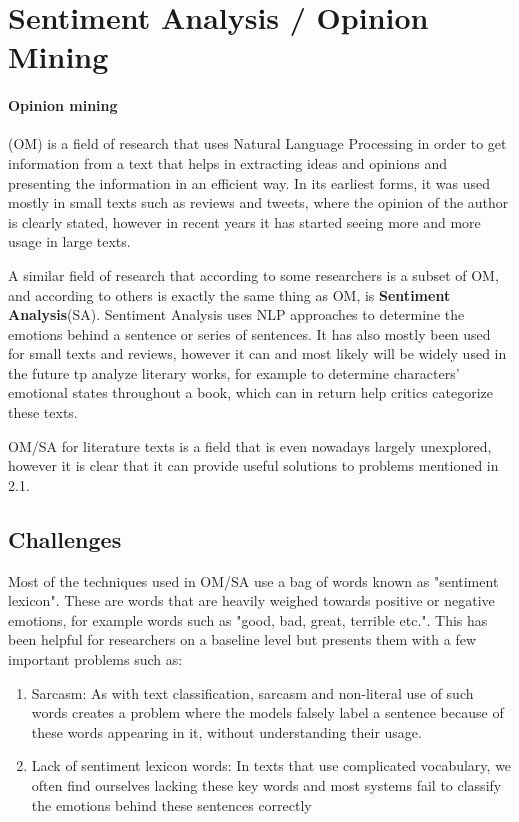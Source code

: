 \documentclass{article}
\begin{document}
	
	\section{Sentiment Analysis / Opinion Mining}
	
	\paragraph{Opinion mining}(OM) is a field of research that uses Natural Language Processing in order to get information from a text that helps in extracting ideas and opinions and presenting the information in an efficient way\cite{pakistan}. In its earliest forms, it was used mostly in small texts such as reviews and tweets, where the opinion of the author is clearly stated, however in recent years it has started seeing more and more usage in large texts. 
	
	A similar field of research that according to some researchers is a subset of OM, and according to others is exactly the same thing as OM\cite{kaur}, is \textbf{Sentiment Analysis}(SA). Sentiment Analysis uses NLP approaches to determine the emotions behind a sentence or series of sentences. It has also mostly been used for small texts and reviews\cite{sergio}, however it can and most likely will be widely used in the future tp analyze literary works, for example to determine characters' emotional states throughout a book, which can in return help critics categorize these texts. \par
	
	OM/SA for literature texts is a field that is even nowadays largely unexplored, however it is clear that it can provide useful solutions to problems mentioned in 2.1.
	
	
	\subsection{Challenges}
	
	Most of the techniques used in OM/SA use a bag of words known as "sentiment lexicon". These are words that are heavily weighed towards positive or negative emotions, for example words such as "good, bad, great, terrible etc."\cite{shelly}. This has been helpful for researchers on a baseline level but presents them with a few important problems such as:
	
	\begin{enumerate}
		\item Sarcasm: As with text classification, sarcasm and non-literal use of such words creates a problem where the models falsely label a sentence because of these words appearing in it, without understanding their usage.
		
		\item Lack of sentiment lexicon words: In texts that use complicated vocabulary, we often find ourselves lacking these key words and most systems fail to classify the emotions behind these sentences correctly
	\end{enumerate}
\end{document}
